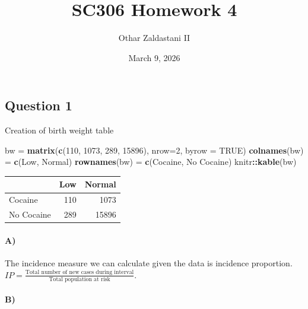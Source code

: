 \documentclass[
]{article}
\title{SC306 Homework 4}
\author{Othar Zaldastani II}
\date{March 9, 2026}
\newenvironment{Shaded}{\begin{snugshade}}{\end{snugshade}}
\newcommand{\AttributeTok}[1]{\textcolor[rgb]{0.13,0.29,0.53}{#1}}
\newcommand{\ConstantTok}[1]{\textcolor[rgb]{0.56,0.35,0.01}{#1}}
\newcommand{\DecValTok}[1]{\textcolor[rgb]{0.00,0.00,0.81}{#1}}
\newcommand{\FunctionTok}[1]{\textcolor[rgb]{0.13,0.29,0.53}{\textbf{#1}}}
\newcommand{\NormalTok}[1]{#1}
\newcommand{\OtherTok}[1]{\textcolor[rgb]{0.56,0.35,0.01}{#1}}
\newcommand{\SpecialCharTok}[1]{\textcolor[rgb]{0.81,0.36,0.00}{\textbf{#1}}}
\newcommand{\StringTok}[1]{\textcolor[rgb]{0.31,0.60,0.02}{#1}}
\begin{document}
\maketitle

\subsection{Question 1}\label{question-1}

Creation of birth weight table

\begin{Shaded}
\begin{Highlighting}[]
\NormalTok{bw }\OtherTok{=} \FunctionTok{matrix}\NormalTok{(}\FunctionTok{c}\NormalTok{(}\DecValTok{110}\NormalTok{, }\DecValTok{1073}\NormalTok{, }\DecValTok{289}\NormalTok{, }\DecValTok{15896}\NormalTok{), }\AttributeTok{nrow=}\DecValTok{2}\NormalTok{, }\AttributeTok{byrow =} \ConstantTok{TRUE}\NormalTok{)}
\FunctionTok{colnames}\NormalTok{(bw) }\OtherTok{=} \FunctionTok{c}\NormalTok{(}\StringTok{\textquotesingle{}Low\textquotesingle{}}\NormalTok{, }\StringTok{\textquotesingle{}Normal\textquotesingle{}}\NormalTok{)}
\FunctionTok{rownames}\NormalTok{(bw) }\OtherTok{=} \FunctionTok{c}\NormalTok{(}\StringTok{\textquotesingle{}Cocaine\textquotesingle{}}\NormalTok{, }\StringTok{\textquotesingle{}No Cocaine\textquotesingle{}}\NormalTok{)}
\NormalTok{knitr}\SpecialCharTok{::}\FunctionTok{kable}\NormalTok{(bw)}
\end{Highlighting}
\end{Shaded}

\begin{longtable}[]{@{}lrr@{}}
\toprule\noalign{}
& Low & Normal \\
\midrule\noalign{}
\endhead
\bottomrule\noalign{}
\endlastfoot
Cocaine & 110 & 1073 \\
No Cocaine & 289 & 15896 \\
\end{longtable}

\paragraph{A)}\label{a}

The incidence measure we can calculate given the data is incidence
proportion.
\(IP = \frac {\text{Total number of new cases during interval}} {\text{Total population at risk}}\).

\paragraph{B)}\label{b}
\end{document}
